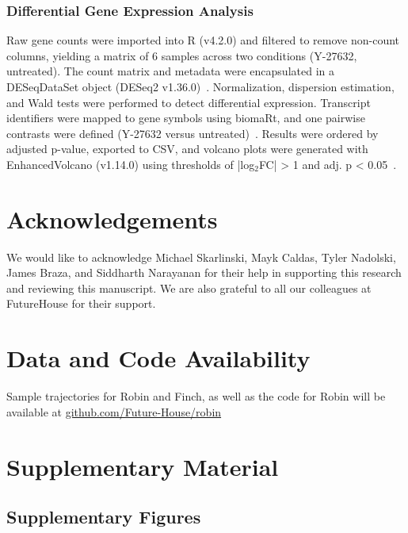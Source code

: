\documentclass{article}
\begin{document}
\subsubsection{Differential Gene Expression Analysis}

Raw gene counts were imported into R (v4.2.0) and filtered to remove non-count columns, yielding a matrix of 6 samples across two conditions (Y-27632, untreated). The count matrix and metadata were encapsulated in a DESeqDataSet object (DESeq2 v1.36.0)~\cite{love_moderated_2014}. Normalization, dispersion estimation, and Wald tests were performed to detect differential expression. Transcript identifiers were mapped to gene symbols using biomaRt, and one pairwise contrasts were defined (Y-27632 versus untreated)~\cite{durinck_mapping_2009}. Results were ordered by adjusted p-value, exported to CSV, and volcano plots were generated with EnhancedVolcano (v1.14.0) using thresholds of |log$_{2}$FC| > 1 and adj. p < 0.05~\cite{noauthor_enhancedvolcano_nodate}.


\section*{Acknowledgements}

We would like to acknowledge Michael Skarlinski, Mayk Caldas, Tyler Nadolski, James Braza, and Siddharth Narayanan for their help in supporting this research and reviewing this manuscript. We are also grateful to all our colleagues at FutureHouse for their support. 

\section*{Data and Code Availability}

Sample trajectories for Robin and Finch, as well as the code for Robin will be available at \url{github.com/Future-House/robin}


\clearpage
  



\newpage
\section{Supplementary Material}

\subsection{Supplementary Figures}
\end{document}
